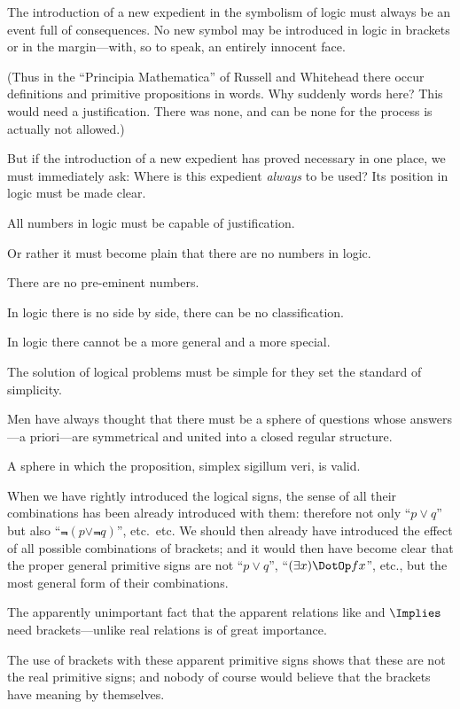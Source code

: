 {The introduction of a new expedient in the
symbolism of logic must always be an event full
of consequences. No new symbol may be introduced
in logic in brackets or in the margin---with,
so to speak, an entirely innocent face.

(Thus in the ``Principia Mathematica'' of
Russell and Whitehead there occur definitions
and primitive propositions in words. Why suddenly
words here? This would need a justification.
There was none, and can be none for the
process is actually not allowed.)

But if the introduction of a new expedient has
proved necessary in one place, we must immediately
ask: Where is this expedient \emph{always} to be
used? Its position in logic must be made
clear.}


{All numbers in logic must be capable of
justification.

Or rather it must become plain that there are
no numbers in logic.

There are no pre-eminent numbers.}


{In logic there is no side by side, there can be
no classification.

In logic there cannot be a more general and a
more special.}


{The solution of logical problems must be simple
for they set the standard of simplicity.

Men have always thought that there must be a
sphere of questions whose answers---a priori---are
symmetrical and united into a closed regular
structure.

A sphere in which the proposition, simplex
sigillum veri, is valid.}


{When we have rightly introduced the logical
signs, the sense of all their combinations has been
already introduced with them: therefore not only
``$p \lor q$'' but also ``$\Not{(p \lor \Not{q})}$'', etc.\ etc. We should
then already have introduced the effect of all
possible combinations of brackets; and it would
then have become clear that the proper general
primitive signs are not ``$p \lor q$'', ``$(\exists x) \DotOp fx$'', etc.,
but the most general form of their combinations.}


{The apparently unimportant fact that the apparent
relations like  and $\Implies$ need brackets---unlike
real relations is of great importance.

The use of brackets with these apparent primitive
signs shows that these are not the real
primitive signs; and nobody of course would
believe that the brackets have meaning by themselves.}


